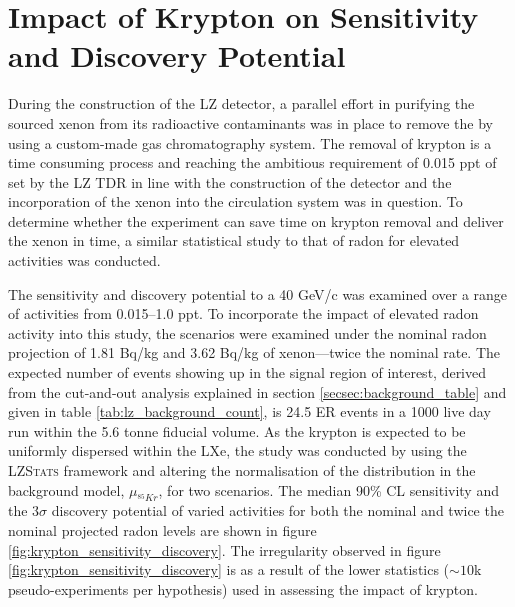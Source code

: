 {\clearpage

\section{Impact of Krypton on Sensitivity and Discovery Potential}
\label{sec:krypton_impact}

During the construction of the LZ detector, a parallel effort in purifying the sourced xenon from its radioactive contaminants was in place to remove the \KrEF{} by using a custom-made gas chromatography system. The removal of krypton is a time consuming process and reaching the ambitious requirement of 0.015 ppt of \KrEF{} set by the LZ TDR \cite{lz_tdr} in line with the construction of the detector and the incorporation of the xenon into the circulation system was in question. To determine whether the experiment can save time on krypton removal and deliver the xenon in time, a similar statistical study to that of radon for elevated \KrEF{} activities was conducted. 

The sensitivity and discovery potential to a 40 GeV/c\squared{} was examined over a range of \KrEF{} activities from 0.015--1.0 ppt. To incorporate the impact of elevated radon activity into this study, the \KrEF{} scenarios were examined under the nominal radon projection of 1.81 \micro{}Bq/kg and 3.62 \micro{}Bq/kg of xenon---twice the nominal rate. The expected number of \KrEF{} events showing up in the signal region of interest, derived from the cut-and-out analysis explained in section \ref{secsec:background_table} and given in table \ref{tab:lz_background_count}, is 24.5 ER events in a 1000 live day run within the 5.6 tonne fiducial volume. As the krypton is expected to be uniformly dispersed within the LXe, the study was conducted by using the \textsc{LZStats} framework and altering the normalisation of the \KrEF{} distribution in the background model, $\mu_{^{85}Kr}$, for two \RnTTT{} scenarios. The median 90\% CL sensitivity and the $3\sigma$ discovery potential of varied \KrEF{} activities for both the nominal and twice the nominal projected radon levels are shown in figure \ref{fig:krypton_sensitivity_discovery}. The irregularity observed in figure \ref{fig:krypton_sensitivity_discovery} is as a result of the lower statistics ($\sim10$k pseudo-experiments per hypothesis) used in assessing the impact of krypton.

}
